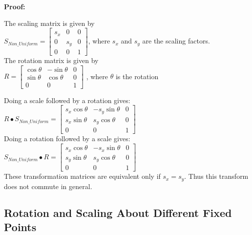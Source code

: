\documentclass[a4paper,10pt]{scrartcl}
\begin{document}
{\bfseries Proof:}

The scaling matrix is given by \\

$S_{Non\_Uniform} = \begin{bmatrix}
    s_x       & 0 & 0 \\
    0       & s_y & 0 \\
    0       & 0 & 1     
 \end{bmatrix}
$, where $s_x$ and $s_y$ are the scaling factors. \\

The rotation matrix is given by \\

$R = \begin{bmatrix}
      \cos{\theta}       & -\sin{\theta} & 0 \\
      \sin{\theta}       & \cos{\theta} & 0 \\
      0       & 0 & 1             
     \end{bmatrix}
$   , where $\theta$ is the rotation

Doing a scale followed by a rotation gives: \\

$R \bullet S_{Non\_Uniform} = \begin{bmatrix}
		  s_x\cos{\theta} & -s_y\sin{\theta} & 0 \\
		  s_x\sin{\theta} & s_y\cos{\theta} & 0 \\
		  0 & 0 & 1
               \end{bmatrix}
$ \\


Doing a rotation followed by a scale gives: \\

$S_{Non\_Uniform} \bullet R = \begin{bmatrix}
		  s_x\cos{\theta} & -s_x\sin{\theta} & 0 \\
		  s_y\sin{\theta} & s_y\cos{\theta} & 0 \\
		  0 & 0 & 1
               \end{bmatrix}
$ \\

These transformation matrices are equivalent only if $s_x = s_y$. Thus this transform does not commute in general.

\subsection{Rotation and Scaling About Different Fixed Points}
\end{document}
